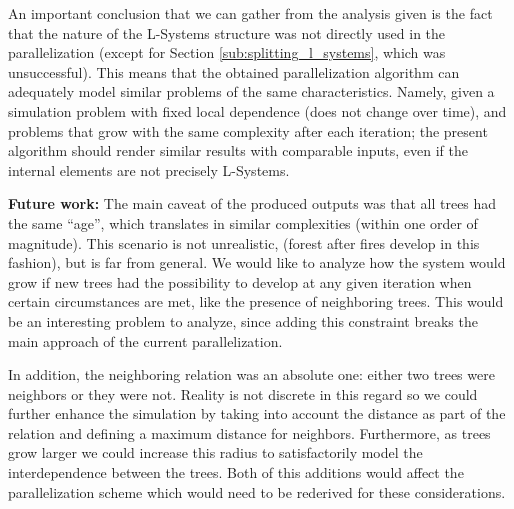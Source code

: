 \documentclass[letterpaper,twoside,11pt]{article}
\begin{document}
\begin{multicols}{2}
An important conclusion that we can gather from the analysis given is the fact that the nature of the L-Systems structure was not directly used in the parallelization (except for Section \ref{sub:splitting_l_systems}, which was unsuccessful). This means that the obtained parallelization algorithm can adequately model similar problems of the same characteristics. Namely, given a simulation problem with fixed local dependence (does not change over time), and problems that grow with the same complexity after each iteration; the present algorithm should render similar results with comparable inputs, even if the internal elements are not precisely L-Systems.

\textbf{Future work:} The main caveat of the produced outputs was that all trees had the same ``age'', which translates in similar complexities (within one order of magnitude). This scenario is not unrealistic, (forest after fires develop in this fashion), but is far from general. We would like to analyze how the system would grow if new trees had the possibility to develop at any given iteration when certain circumstances are met, like the presence of neighboring trees. This would be an interesting problem to analyze, since adding this constraint breaks the main approach of the current parallelization.

In addition, the neighboring relation was an absolute one: either two trees were neighbors or they were not. Reality is not discrete in this regard so we could further enhance the simulation by taking into account the distance as part of the relation and defining a maximum distance for neighbors. Furthermore, as trees grow larger we could increase this radius to satisfactorily model the interdependence between the trees. Both of this additions would affect the parallelization scheme which would need to be rederived for these considerations.



\nocite{*}



 


\end{multicols}
\end{document}
